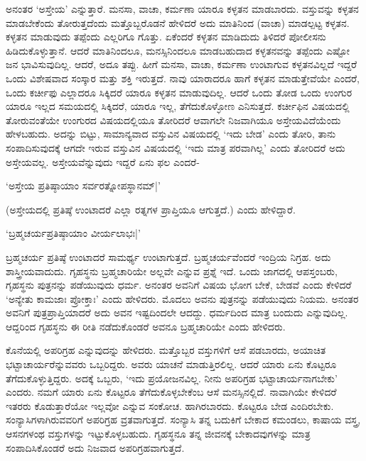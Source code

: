 ಅನಂತರ `ಅಸ್ತೇಯ' ಎನ್ನುತ್ತಾರೆ. ಮನಸಾ, ವಾಚಾ, ಕರ್ಮಣಾ ಯಾರೂ ಕಳ್ಳತನ ಮಾಡಬಾರದು. ವಸ್ತುವನ್ನು ಕಳ್ಳತನ ಮಾಡಬೇಕೆಂದು ತೋರುತ್ತದೆಂದು ಮತ್ತೊಬ್ಬರೊಡನೆ ಹೇಳಿದರೆ ಅದು ಮಾತಿನಿಂದ (ವಾಚಾ) ಮಾಡಲ್ಪಟ್ಟ ಕಳ್ಳತನ. ಕಳ್ಳತನ ಮಾಡುವುದು ತಪ್ಪೆಂದು ಎಲ್ಲರಿಗೂ ಗೊತ್ತು. ಏಕೆಂದರೆ ಕಳ್ಳತನ ಮಾಡಿದುದು ತಿಳಿದರೆ ಪೋಲೀಸನು ಹಿಡಿದುಕೊಳ್ಳುತ್ತಾನೆ. ಆದರೆ ಮಾತಿನಿಂದಲೂ, ಮನಸ್ಸಿನಿಂದಲೂ ಮಾಡಬಹುದಾದ ಕಳ್ಳತನವನ್ನು ತಪ್ಪೆಂದು ಎಷ್ಟೋ ಜನ ಭಾವಿಸುವುದಿಲ್ಲ. ಆದರೆ, ಅದೂ ತಪ್ಪು. ಹೀಗೆ ಮನಸಾ, ವಾಚಾ, ಕರ್ಮಣಾ ಉಂಟಾಗುವ ಕಳ್ಳತನವಿಲ್ಲದೆ ಇದ್ದರೆ ಒಂದು ವಿಶೇಷವಾದ ಸಂಸ್ಕಾರ ಮತ್ತು ಶಕ್ತಿ ಇರುತ್ತದೆ. ನಾವು ಯಾರಾದರೂ ಹಾಗೆ ಕಳ್ಳತನ ಮಾಡುತ್ತೇವೆಯೇ ಎಂದರೆ, ಒಂದು ಕರ್ಚೀಫು ಎಲ್ಲಾದರೂ ಸಿಕ್ಕಿದರೆ ಯಾರೂ ಕಳ್ಳತನ ಮಾಡುವುದಿಲ್ಲ. ಆದರೆ ಒಂದು ತೋಡ ಒಂದು ಉಂಗುರ ಯಾರೂ ಇಲ್ಲದ ಸಮಯದಲ್ಲಿ ಸಿಕ್ಕಿದರೆ, ಯಾರೂ ಇಲ್ಲ, ತೆಗೆದುಕೊಳ್ಳೋಣ ಎನಿಸುತ್ತದೆ. ಕರ್ಚೀಫಿನ ವಿಷಯದಲ್ಲಿ ತೋರುವಂತೆಯೇ ಉಂಗುರದ ವಿಷಯದಲ್ಲಿಯೂ ತೋರಿದರೆ ಆವಾಗಲೇ ನಿಜವಾಗಿಯೂ ಅಸ್ತೇಯವಿದೆಯೆಂದು ಹೇಳಬಹುದು. ಅದನ್ನು ಬಿಟ್ಟು, ಸಾಮಾನ್ಯವಾದ ವಸ್ತುವಿನ ವಿಷಯದಲ್ಲಿ `ಇದು ಬೇಡ' ಎಂದು ತೋರಿ, ತಾನು ಸಂಪಾದಿಸುವುದಕ್ಕೆ ಆಗದೇ ಇರುವ ವಸ್ತುವಿನ ವಿಷಯದಲ್ಲಿ `ಇದು ಮಾತ್ರ ಪರವಾಗಿಲ್ಲ' ಎಂದು ತೋರಿದರೆ ಅದು ಅಸ್ತೇಯವಲ್ಲ. ಅಸ್ತೇಯವೆನ್ನುವುದು ಇದ್ದರೆ ಏನು ಫಲ ಎಂದರೆ-

\begin{shloka}
`ಅಸ್ತೇಯ ಪ್ರತಿಷ್ಠಾಯಾಂ ಸರ್ವರತ್ನೋಪಸ್ಥಾನಮ್|'
\end{shloka}

(ಅಸ್ತೇಯದಲ್ಲಿ ಪ್ರತಿಷ್ಠೆ ಉಂಟಾದರೆ ಎಲ್ಲಾ ರತ್ನಗಳ ಪ್ರಾಪ್ತಿಯೂ ಆಗುತ್ತದೆ.) ಎಂದು ಹೇಳಿದ್ದಾರೆ.

\begin{shloka}
`ಬ್ರಹ್ಮಚರ್ಯಪ್ರತಿಷ್ಠಾಯಾಂ ವೀರ್ಯಲಾಭಃ|'
\end{shloka}

ಬ್ರಹ್ಮಚರ್ಯ ಪ್ರತಿಷ್ಠೆ ಉಂಟಾದರೆ ಸಾಮರ್ಥ್ಯ ಉಂಟಾಗುತ್ತದೆ. ಬ್ರಹ್ಮಚರ್ಯವೆಂದರೆ ಇಂದ್ರಿಯ ನಿಗ್ರಹ. ಅದು ಶಾಸ್ತ್ರೀಯವಾದುದು. ಗೃಹಸ್ಥನು ಬ್ರಹ್ಮಚಾರಿಯೇ ಅಲ್ಲವೇ ಎನ್ನುವ ಪ್ರಶ್ನೆ ಇದೆ. ಒಂದು ಜಾಗದಲ್ಲಿ ಆಪಸ್ತಂಬರು, ಗೃಹಸ್ಥನು ಪುತ್ರನನ್ನು ಪಡೆಯುವುದು ಧರ್ಮ. ಅನಂತರ ಅವನಿಗೆ ವಿಷಯ ಭೋಗ ಬೇಕೆ, ಬೇಡವೆ ಎಂದು ಕೇಳಿದರೆ `ಅನ್ಯೇತು ಕಾಮಜಾಃ ಪ್ರೋಕ್ತಾಃ' ಎಂದು ಹೇಳಿದರು. ಮೊದಲು ಅವನು ಪುತ್ರನನ್ನು ಪಡೆಯುವುದು ನಿಯಮ. ಅನಂತರ ಅವನಿಗೆ ಪುತ್ರಪ್ರಾಪ್ತಿಯಾದರೆ ಅದು ಅವನ ಇಷ್ಟದಿಂದಲೇ ಆದದ್ದು. ಧರ್ಮದಿಂದ ಮಾತ್ರ ಬಂದುದು ಎನ್ನುವುದಿಲ್ಲ. ಆದ್ದರಿಂದ ಗೃಹಸ್ಥನು ಈ ರೀತಿ ನಡೆದುಕೊಂಡರೆ ಅವನೂ ಬ್ರಹ್ಮಚಾರಿಯೇ ಎಂದು ಹೇಳಿದರು.

ಕೊನೆಯಲ್ಲಿ ಅಪರಿಗ್ರಹ ಎನ್ನುವುದನ್ನು ಹೇಳಿದರು. ಮತ್ತೊಬ್ಬರ ವಸ್ತುಗಳಿಗೆ ಆಸೆ ಪಡಬಾರದು, ಅಯಾಚಿತ ಭಟ್ಟಾಚಾರ್ಯರೆನ್ನುವವರು ಒಬ್ಬರಿದ್ದರು. ಅವರು ಯಾಚನೆ ಮಾಡುತ್ತಿರಲಿಲ್ಲ. ಆದರೆ ಯಾರು ಏನು ಕೊಟ್ಟರೂ ತೆಗೆದುಕೊಳ್ಳುತ್ತಿದ್ದರು. ಅದಕ್ಕೆ ಒಬ್ಬರು, `ಇದು ಪ್ರಯೋಜನವಿಲ್ಲ. ನೀನು ಅಪರಿಗ್ರಹ ಭಟ್ಟಾಚಾರ್ಯನಾಗಬೇಕು' ಎಂದರು. ನಮಗೆ ಯಾರು ಏನು ಕೊಟ್ಟರೂ ತೆಗೆದುಕೊಳ್ಳಬೇಕೆಂಬ ಆಸೆ ಮನಸ್ಸಿನಲ್ಲಿದೆ. ನಾವಾಗಿಯೇ ಕೇಳಿದರೆ ಇತರರು ಕೊಡುತ್ತಾರೆಯೋ ಇಲ್ಲವೋ ಎನ್ನುವ ಸಂಕೋಚ. ಹಾಗಿರಬಾರದು. ಕೊಟ್ಟರೂ ಬೇಡ ಎಂದಿರಬೇಕು. ಸಂನ್ಯಾಸಿಗಳಾಗಿರುವವರಿಗೆ ಅಪರಿಗ್ರಹ ವ್ರತವಾಗುತ್ತದೆ. ಸಂನ್ಯಾಸಿ ತನ್ನ ಬದುಕಿಗೆ ಬೇಕಾದ ಕಮಂಡಲು, ಕಾಷಾಯ ವಸ್ತ್ರ, ಆಸನಗಳಂಥ ವಸ್ತುಗಳನ್ನು ಇಟ್ಟುಕೊಳ್ಳಬಹುದು. ಗೃಹಸ್ಥನೂ ತನ್ನ ಜೀವನಕ್ಕೆ ಬೇಕಾದವುಗಳನ್ನು ಮಾತ್ರ ಸಂಪಾದಿಸಿಕೊಂಡರೆ ಅದು ನಿಜವಾದ ಅಪರಿಗ್ರಹವಾಗುತ್ತದೆ.

